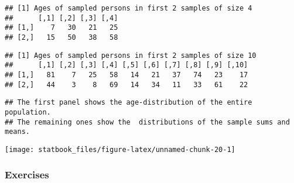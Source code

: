 \documentclass[]{book}
\begin{document}
\begin{verbatim}
## [1] Ages of sampled persons in first 2 samples of size 4
##      [,1] [,2] [,3] [,4]
## [1,]    7   30   21   25
## [2,]   15   50   38   58
\end{verbatim}

\begin{verbatim}
## [1] Ages of sampled persons in first 2 samples of size 10
##      [,1] [,2] [,3] [,4] [,5] [,6] [,7] [,8] [,9] [,10]
## [1,]   81    7   25   58   14   21   37   74   23    17
## [2,]   44    3    8   69   14   34   11   33   61    22
\end{verbatim}

\begin{verbatim}
## The first panel shows the age-distribution of the entire population.
## The remaining ones show the  distributions of the sample sums and means.
\end{verbatim}

\begin{center}\texttt{[image: statbook\_files/figure-latex/unnamed-chunk-20-1]} \end{center}

\hypertarget{exercises-2}{%
\subsubsection{Exercises}\label{exercises-2}}
\end{document}
